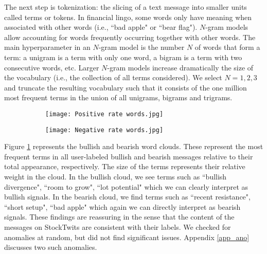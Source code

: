 The next step is tokenization: the slicing of a text message into smaller units called terms or tokens. In financial lingo, some words only have meaning when associated with other words (i.e., ``bad apple" or ``bear flag"). $N$-gram models allow accounting for words frequently occurring together with other words. The main hyperparameter in an $N$-gram model is the number $N$ of words that form a term: a unigram is a term with only one word, a bigram is a term with two consecutive words, etc. Larger $N$-gram models increase dramatically the size of the vocabulary (i.e., the collection of all terms considered). We select $N=1,2,3$ and truncate the resulting vocabulary such that it consists of the one million most frequent terms in the union of all unigrams, bigrams and trigrams. 

\begin{figure}[h]
\centering
\begin{subfigure}{0.49\textwidth}
\centering
\texttt{[image: Positive rate words.jpg]}
\end{subfigure}
\begin{subfigure}{0.49\textwidth}
\centering
        \texttt{[image: Negative rate words.jpg]}
\end{subfigure}
    \label{wordclouds}
\end{figure}


Figure \ref{wordclouds} represents the bullish and bearish word clouds. These represent the most frequent terms in all user-labeled bullish and bearish messages relative to their total appearance, respectively. The size of the terms represents their relative weight in the cloud. In the bullish cloud, we see terms such as ``bullish divergence", ``room to grow", ``lot potential" which we can clearly interpret as bullish signals. In the bearish cloud, we find terms such as ``recent resistance", ``short setup", ``bad apple" which again we can directly interpret as bearish signals. These findings are reassuring in the sense that the content of the messages on StockTwits are consistent with their labels. We checked for anomalies at random, but did not find significant issues. Appendix \ref{app_ano} discusses two such anomalies. 







